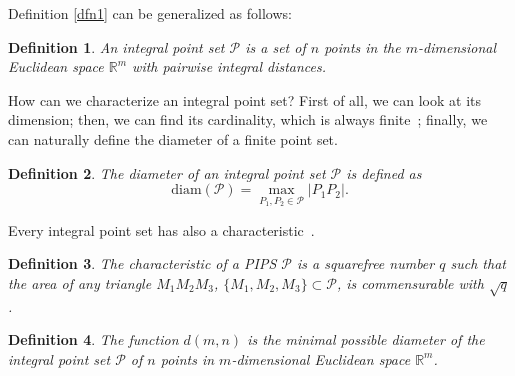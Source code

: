 \documentclass[12pt]{article}
\theoremstyle{theorem}
\theoremstyle{dfn}
\newtheorem{dfn}{Definition}
\theoremstyle{remark}
\begin{document}
Definition \ref{dfn1} can be generalized as follows:

\begin{dfn}
	An integral point set $\mathcal{P}$ is a set of $n$ points in
	the $m$-dimensional Euclidean space $\mathbb{R}^{m}$ with pairwise
	integral distances.
\end{dfn}

How can we characterize an integral point set?
First of all, we can look at its dimension;
then, we can find its cardinality, which is always finite~\cite{anning1945integral,erdos1945integral};
finally, we can naturally %
define the diameter of a finite point set.

\begin{dfn}
	The diameter of an integral point set $\mathcal{P}$ is defined as
	\begin{equation}
		\operatorname{diam(\mathcal{P})} = \underset{P_{1}, P_{2} \in
		\mathcal{P}}{\max} |P_{1}P_{2}|
		.
	\end{equation}
\end{dfn}

Every integral point set has also a characteristic~\cite{kemnitz1988punktmengen,kurz2005characteristic}.

\begin{dfn}
	The characteristic of a PIPS $\mathcal{P}$ is a squarefree number $q$
	such that the area of any triangle $M_1M_2M_3$, $\{M_1,M_2,M_3\}\subset \mathcal{P}$,
	is commensurable with $\sqrt{q}$.
\end{dfn}


\begin{dfn}
	The function $d(m, n)$ is the minimal possible diameter of
	the integral point set $\mathcal{P}$ of $n$ points in
	$m$-dimensional Euclidean space $\mathbb{R}^{m}$.
\end{dfn}


%

\end{document}

